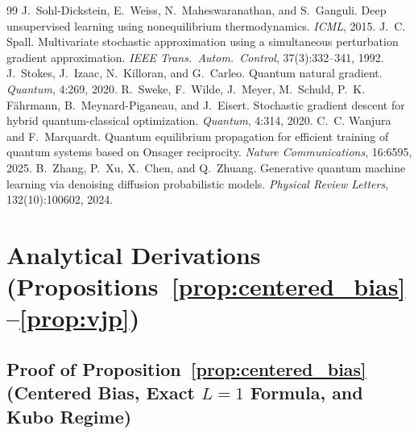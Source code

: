 \documentclass[11pt]{article}
\begin{document}
\begin{thebibliography}{99}
 J.~Sohl-Dickstein, E.~Weiss, N.~Maheswaranathan, and S.~Ganguli. Deep unsupervised learning using nonequilibrium thermodynamics. {\em ICML}, 2015.
 J.~C. Spall. Multivariate stochastic approximation using a simultaneous perturbation gradient approximation. {\em IEEE Trans.\ Autom.\ Control}, 37(3):332--341, 1992.
 J.~Stokes, J.~Izaac, N.~Killoran, and G.~Carleo. Quantum natural gradient. {\em Quantum}, 4:269, 2020.
 R.~Sweke, F.~Wilde, J.~Meyer, M.~Schuld, P.~K. F{\"a}hrmann, B.~Meynard-Piganeau, and J.~Eisert. Stochastic gradient descent for hybrid quantum-classical optimization. {\em Quantum}, 4:314, 2020.
 C.~C. Wanjura and F.~Marquardt. Quantum equilibrium propagation for efficient training of quantum systems based on Onsager reciprocity. {\em Nature Communications}, 16:6595, 2025.
 B.~Zhang, P.~Xu, X.~Chen, and Q.~Zhuang. Generative quantum machine learning via denoising diffusion probabilistic models. {\em Physical Review Letters}, 132(10):100602, 2024.
\end{thebibliography}

\clearpage
\appendix

\section{Analytical Derivations (Propositions~\ref{prop:centered_bias}--\ref{prop:vjp})}
\label{app:proofs}

\subsection{Proof of Proposition~\ref{prop:centered_bias} (Centered Bias, Exact \texorpdfstring{$L{=}1$}{L=1} Formula, and Kubo Regime)}
\end{document}
